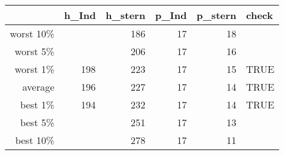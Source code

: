 \begin{tabular}{rrrrrl}
  \toprule
 & h\_Ind & h\_stern & p\_Ind & p\_stern & check \\ 
  \midrule
worst 10\% &  & 186 & 17 & 18 &  \\ 
  worst 5\% &  & 206 & 17 & 16 &  \\ 
  worst 1\% & 198 & 223 & 17 & 15 & TRUE \\ 
  average & 196 & 227 & 17 & 14 & TRUE \\ 
  best 1\% & 194 & 232 & 17 & 14 & TRUE \\ 
  best 5\% &  & 251 & 17 & 13 &  \\ 
  best 10\% &  & 278 & 17 & 11 &  \\ 
   \bottomrule
\end{tabular}
